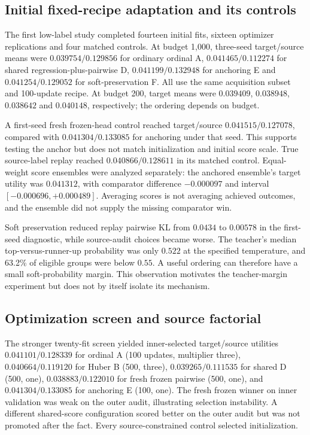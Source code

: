 \subsection{Initial fixed-recipe adaptation and its controls}
The first low-label study completed fourteen initial fits, sixteen optimizer replications and four matched controls. At budget 1,000, three-seed target/source means were $0.039754/0.129856$ for ordinary ordinal A, $0.041465/0.112274$ for shared regression-plus-pairwise D, $0.041199/0.132948$ for anchoring E and $0.041254/0.129052$ for soft-preservation F. All use the same acquisition subset and 100-update recipe. At budget 200, target means were $0.039409$, $0.038948$, $0.038642$ and $0.040148$, respectively; the ordering depends on budget.

A first-seed fresh frozen-head control reached target/source $0.041515/0.127078$, compared with $0.041304/0.133085$ for anchoring under that seed. This supports testing the anchor but does not match initialization and initial score scale. True source-label replay reached $0.040866/0.128611$ in its matched control. Equal-weight score ensembles were analyzed separately: the anchored ensemble's target utility was $0.041312$, with comparator difference $-0.000097$ and interval $[-0.000696,+0.000489]$. Averaging scores is not averaging achieved outcomes, and the ensemble did not supply the missing comparator win.

Soft preservation reduced replay pairwise KL from $0.0434$ to $0.00578$ in the first-seed diagnostic, while source-audit choices became worse. The teacher's median top-versus-runner-up probability was only $0.522$ at the specified temperature, and 63.2\% of eligible groups were below $0.55$. A useful ordering can therefore have a small soft-probability margin. This observation motivates the teacher-margin experiment but does not by itself isolate its mechanism.

\subsection{Optimization screen and source factorial}
The stronger twenty-fit screen yielded inner-selected target/source utilities $0.041101/0.128339$ for ordinal A (100 updates, multiplier three), $0.040664/0.119120$ for Huber B (500, three), $0.039265/0.111535$ for shared D (500, one), $0.038883/0.122010$ for fresh frozen pairwise (500, one), and $0.041304/0.133085$ for anchoring E (100, one). The fresh frozen winner on inner validation was weak on the outer audit, illustrating selection instability. A different shared-score configuration scored better on the outer audit but was not promoted after the fact. Every source-constrained control selected initialization.

